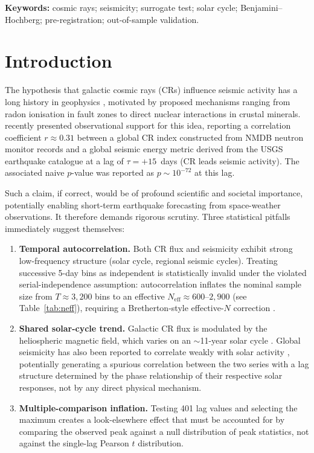 \documentclass[12pt,a4paper]{article}
\begin{document}
\textbf{Keywords:} cosmic rays; seismicity; surrogate test; solar cycle;
Benjamini--Hochberg; pre-registration; out-of-sample validation.

\newpage
\tableofcontents
\newpage

\section{Introduction}
\label{sec:intro}

The hypothesis that galactic cosmic rays (CRs) influence seismic activity has
a long history in geophysics \citep{Stoupel1990,Urata2018}, motivated by
proposed mechanisms ranging from radon ionisation in fault zones to direct
nuclear interactions in crustal minerals.
\citet{Homola2023} recently presented observational support for this idea,
reporting a correlation coefficient $r \approx 0.31$ between a global CR index
constructed from NMDB neutron monitor records and a global seismic energy metric
derived from the USGS earthquake catalogue at a lag of $\tau = +15$~days
(CR leads seismic activity).
The associated naive $p$-value was reported as $p \sim 10^{-72}$ at this lag.

Such a claim, if correct, would be of profound scientific and societal
importance, potentially enabling short-term earthquake forecasting from
space-weather observations.
It therefore demands rigorous scrutiny.
Three statistical pitfalls immediately suggest themselves:

\begin{enumerate}
  \item \textbf{Temporal autocorrelation.}
    Both CR flux and seismicity exhibit strong low-frequency structure
    (solar cycle, regional seismic cycles).
    Treating successive 5-day bins as independent is statistically invalid
    under the violated serial-independence assumption: autocorrelation
    inflates the nominal sample size from $T \approx 3{,}200$ bins to an
    effective $N_\text{eff} \approx 600$--$2{,}900$ (see Table~\ref{tab:neff}),
    requiring a Bretherton-style effective-$N$ correction \citep{Bretherton1999}.

  \item \textbf{Shared solar-cycle trend.}
    Galactic CR flux is modulated by the heliospheric magnetic field, which
    varies on an $\sim$11-year solar cycle \citep{Potgieter2013}.
    Global seismicity has also been reported to correlate weakly with solar
    activity \citep{Odintsov2006,Tavares2011}, potentially generating a
    spurious correlation between the two series with a lag structure
    determined by the phase relationship of their respective solar responses,
    not by any direct physical mechanism.

  \item \textbf{Multiple-comparison inflation.}
    Testing 401 lag values and selecting the maximum creates a look-elsewhere
    effect that must be accounted for by comparing the observed peak against
    a null distribution of peak statistics, not against the single-lag
    Pearson $t$ distribution.
\end{enumerate}
\end{document}
